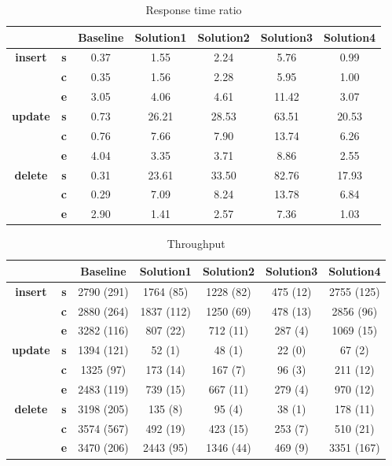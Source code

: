 \begin{table}[h]
\centering
\caption{Response time ratio}\label{t:}
\begin{tabular}{ccccccc}
\toprule
&&\textbf{Baseline} & \textbf{Solution1} & \textbf{Solution2} & \textbf{Solution3} & \textbf{Solution4}\\
\midrule
\multirow{3}{*}{\textbf{insert}} & \textbf{s} & 0.37 & 1.55 & 2.24 & 5.76 & 0.99\\
 & \textbf{c} & 0.35 & 1.56 & 2.28 & 5.95 & 1.00\\
 & \textbf{e} & 3.05 & 4.06 & 4.61 & 11.42 & 3.07\\
\midrule
\multirow{3}{*}{\textbf{update}} & \textbf{s} & 0.73 & 26.21 & 28.53 & 63.51 & 20.53\\
 & \textbf{c} & 0.76 & 7.66 & 7.90 & 13.74 & 6.26\\
 & \textbf{e} & 4.04 & 3.35 & 3.71 & 8.86 & 2.55\\
\midrule
\multirow{3}{*}{\textbf{delete}} & \textbf{s} & 0.31 & 23.61 & 33.50 & 82.76 & 17.93\\
 & \textbf{c} & 0.29 & 7.09 & 8.24 & 13.78 & 6.84\\
 & \textbf{e} & 2.90 & 1.41 & 2.57 & 7.36 & 1.03\\
\bottomrule
\end{tabular}
\end{table}






\begin{table}[h]
\centering
\caption{Throughput}\label{t:}
\begin{tabular}{ccccccc}
\toprule
&&\textbf{Baseline} & \textbf{Solution1} & \textbf{Solution2} & \textbf{Solution3} & \textbf{Solution4}\\
\midrule
\multirow{3}{*}{\textbf{insert}} & \textbf{s} & 2790 (291) & 1764 (85) & 1228 (82) & 475 (12) & 2755 (125)\\
 & \textbf{c} & 2880 (264) & 1837 (112) & 1250 (69) & 478 (13) & 2856 (96)\\
 & \textbf{e} & 3282 (116) & 807 (22) & 712 (11) & 287 (4) & 1069 (15)\\
\midrule
\multirow{3}{*}{\textbf{update}} & \textbf{s} & 1394 (121) & 52 (1) & 48 (1) & 22 (0) & 67 (2)\\
 & \textbf{c} & 1325 (97) & 173 (14) & 167 (7) & 96 (3) & 211 (12)\\
 & \textbf{e} & 2483 (119) & 739 (15) & 667 (11) & 279 (4) & 970 (12)\\
\midrule
\multirow{3}{*}{\textbf{delete}} & \textbf{s} & 3198 (205) & 135 (8) & 95 (4) & 38 (1) & 178 (11)\\
 & \textbf{c} & 3574 (567) & 492 (19) & 423 (15) & 253 (7) & 510 (21)\\
 & \textbf{e} & 3470 (206) & 2443 (95) & 1346 (44) & 469 (9) & 3351 (167)\\
\bottomrule
\end{tabular}
\end{table}



